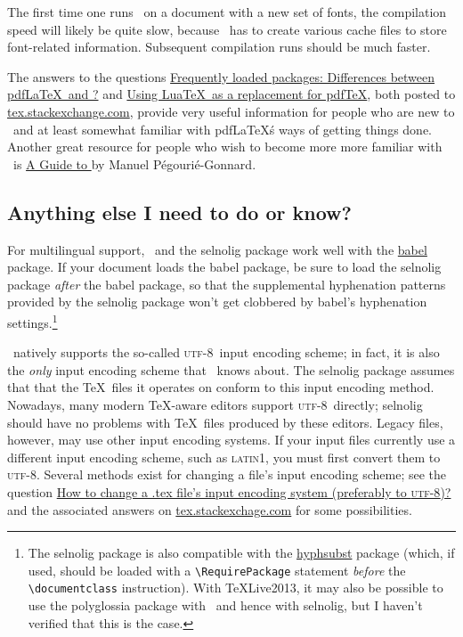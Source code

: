 \documentclass[11pt]{article}
\newcommand{\pkg}[1]{\textsf{#1}}
\newcommand\utf{\textsc{utf-8}}
\begin{document}
The first time one runs \LuaLaTeX\ on a document with a new set of fonts, the compilation speed will likely be quite slow, because \LuaLaTeX\ has to create various cache files to store font-related information. Subsequent compilation runs should be much faster. 

The answers to the questions \href{http://tex.stackexchange.com/q/28642/5001}{Frequently loaded packages: Differences between pdf\LaTeX\ and \LuaLaTeX?} and \href{http://tex.stackexchange.com/q/32295/5001}{Using Lua\TeX\ as a replacement for pdf\TeX}, both posted to \href{http://tex.stackexchange.com/}{tex.stackexchange.com}, provide very useful information for people who are new to \LuaLaTeX\ and at least somewhat familiar with pdf\LaTeX\'s ways of getting things done. Another great resource for people who wish to become more more familiar with \LuaLaTeX\ is \href{http://mirror.ctan.org/info/luatex/lualatex-doc/lualatex-doc.pdf}{A Guide to \LuaLaTeX} by Manuel Pégourié-Gonnard.


\subsection{Anything else I need to do or know?} \label{sec:anythingelse}

For multilingual support, \LuaLaTeX\ and the \pkg{selnolig} package work well with the \href{http://www.ctan.org/pkg/babel}{\pkg{babel}} package. If your document loads the \pkg{babel} package, be sure to load the \pkg{selnolig} package \emph{after} the \pkg{babel} package, so that the supplemental hyphenation patterns provided by the \pkg{selnolig} package won't get clobbered by \pkg{babel}'s hyphenation settings.\footnote{The \pkg{selnolig} package is also compatible with the \href{http://www.ctan.org/pkg/hyphsubst}{\pkg{hyphsubst}} package (which, if used, should be loaded with a \Verb+\RequirePackage+ statement \emph{before} the \Verb+\documentclass+ instruction). With \TeX Live2013, it may also be possible to use the \pkg{polyglossia} package with \LuaLaTeX\ and hence with \pkg{selnolig}, but I haven't verified that this is the case.}

\LuaLaTeX\ natively supports the so-called \utf\ input encoding scheme; in fact, it is also the \emph{only} input encoding scheme that \LuaLaTeX\ knows about. The \pkg{selnolig} package assumes that that the \TeX\ files it operates on conform to this input encoding method. Nowadays, many modern \TeX-aware editors support \utf\ directly; \pkg{selnolig} should have no problems with \TeX\ files produced by these editors. Legacy files, however, may use other input encoding systems. If your input files currently use a different input encoding scheme, such as \textsc{latin1}, you must first convert them to \utf. Several methods exist for changing a file's input encoding scheme; see the question \href{http://tex.stackexchange.com/q/87406/5001}{How to change a .tex file's input encoding system (preferably to \utf)?} and the associated answers on \url{tex.stackexchage.com} for some possibilities.
\end{document}
